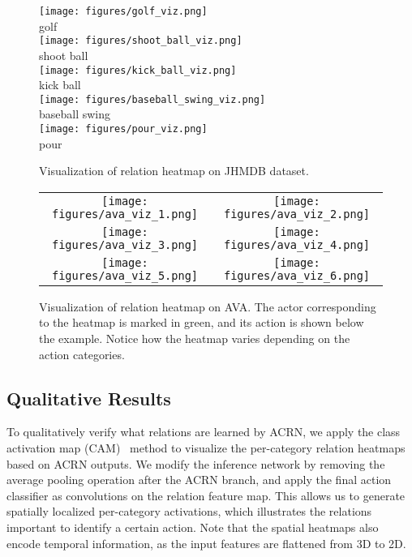 \documentclass[runningheads]{llncs}
\begin{document}
\begin{figure}
\centering
\texttt{[image: figures/golf\_viz.png]}
\\
golf
\\
\texttt{[image: figures/shoot\_ball\_viz.png]}
\\
shoot ball
\\
\texttt{[image: figures/kick\_ball\_viz.png]}
\\
kick ball
\\
\texttt{[image: figures/baseball\_swing\_viz.png]}
\\
baseball swing
\\
\texttt{[image: figures/pour\_viz.png]}
\\
pour
\\
\caption{Visualization of relation heatmap on JHMDB dataset.}
\label{fig:viz_cam}
\end{figure}

\begin{figure}
\begin{center}
\begin{tabular}{cc}
\texttt{[image: figures/ava\_viz\_1.png]}&
\texttt{[image: figures/ava\_viz\_2.png]}\\
\texttt{[image: figures/ava\_viz\_3.png]}&
\texttt{[image: figures/ava\_viz\_4.png]}\\
\texttt{[image: figures/ava\_viz\_5.png]}&
\texttt{[image: figures/ava\_viz\_6.png]}\\
\end{tabular}
\end{center}
\caption{Visualization of relation heatmap on AVA. The actor corresponding to the heatmap is marked in green, and its action is shown below the example. Notice how the heatmap varies depending on the action categories.}
\label{fig:ava_viz}
\end{figure}

\subsection{Qualitative Results}

To qualitatively verify what relations are learned by ACRN, we apply the class activation map (CAM)~\cite{zhou2016cvpr_cam} method to visualize the per-category relation heatmaps based on ACRN outputs. We modify the inference network by removing the average pooling operation after the ACRN branch, and apply the final action classifier as  convolutions on the relation feature map. This allows us to generate spatially localized per-category activations, which illustrates the relations important to identify a certain action. Note that the spatial heatmaps also encode temporal information, as the input features are flattened from 3D to 2D.
\end{document}
